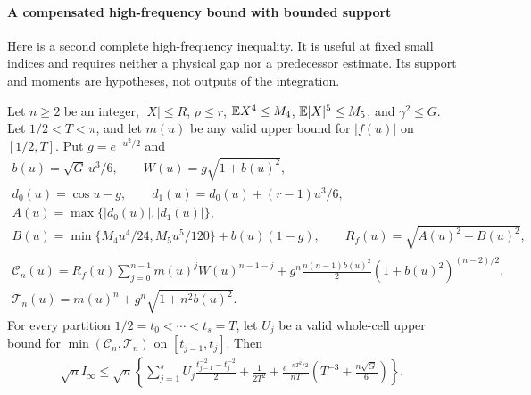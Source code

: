 \paragraph{A compensated high-frequency bound with bounded support}
\label{ms:fourier:rescore:sec:compensated-high}

Here is a second complete high-frequency inequality. It is useful at fixed small
indices and requires neither a physical gap nor a predecessor estimate.
Its support and moments are hypotheses, not outputs of the integration.

\begin{lemma}
\label{ms:fourier:rescore:lem:compensated-high}
Let $n\ge2$ be an integer, $|X|\le R$, $\rho\le r$,
$\mathbb E X^4\le M_4$, $\mathbb E|X|^5\le M_5$, and $\gamma^2\le G$.
Let $1/2<T<\pi$, and let $m(u)$ be any valid upper bound for $|f(u)|$
on $[1/2,T]$. Put $g=e^{-u^2/2}$ and
\begin{gather*}
 b(u)=\sqrt G\,u^3/6,\qquad W(u)=g\sqrt{1+b(u)^2},\\
 d_0(u)=\cos u-g,\qquad d_1(u)=d_0(u)+(r-1)u^3/6,\\
 A(u)=\max\{|d_0(u)|,|d_1(u)|\},\\
 B(u)=\min\{M_4u^4/24,M_5u^5/120\}+b(u)(1-g),\qquad
 R_f(u)=\sqrt{A(u)^2+B(u)^2},\\
 \mathcal C_n(u)=R_f(u)\sum_{j=0}^{n-1}m(u)^jW(u)^{n-1-j}
 +g^n\frac{n(n-1)b(u)^2}{2}(1+b(u)^2)^{(n-2)/2},\\
 \mathcal T_n(u)=m(u)^n+g^n\sqrt{1+n^2b(u)^2}.
\end{gather*}
For every partition $1/2=t_0<\cdots<t_s=T$, let $U_j$ be a valid
whole-cell upper bound for $\min(\mathcal C_n,\mathcal T_n)$ on
$[t_{j-1},t_j]$. Then
\begin{align}
 \sqrt n I_\infty\le\sqrt n\left\{
 \sum_{j=1}^s U_j\frac{t_{j-1}^{-2}-t_j^{-2}}2
 +\frac1{2T^2}
 +\frac{e^{-nT^2/2}}{nT}
       \left(T^{-3}+\frac{n\sqrt G}{6}\right)\right\}.
 \label{ms:fourier:rescore:eq:compensated-high}
\end{align}
\end{lemma}
